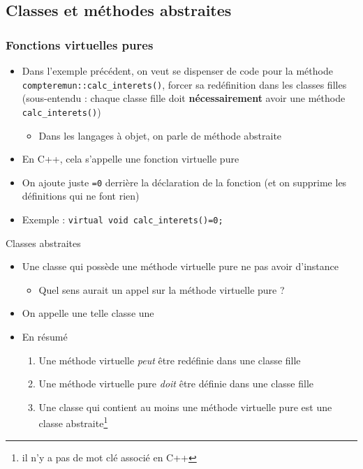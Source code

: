 


\subsection{Classes et méthodes abstraites}

\begin{frame}[fragile]\frametitle{Fonctions virtuelles pures}
\label{secabstract}
\begin{itemize}
\item Dans l'exemple précédent, on veut se dispenser de code pour la méthode \verb!compteremun::calc_interets()!, forcer sa redéfinition dans les classes filles (sous-entendu : chaque classe fille doit \textbf{nécessairement} avoir une méthode \verb|calc_interets()|)
\begin{itemize}
\item Dans les langages à objet, on parle de méthode abstraite
\end{itemize}
\item En C++, cela s'appelle une fonction virtuelle pure
\item On ajoute juste \verb|=0| derrière la déclaration de la fonction (et on supprime les définitions qui ne font rien)
\item Exemple : \verb|virtual void calc_interets()=0;|
\end{itemize}
\end{frame}

\begin{frame}{Classes abstraites}
\begin{itemize}
\item Une classe qui possède une méthode virtuelle pure ne pas avoir d'instance
\begin{itemize}
\item Quel sens aurait un appel sur la méthode virtuelle pure ?
\end{itemize}
\item On appelle une telle classe une 
\item En résumé
\begin{enumerate}
\item Une méthode virtuelle \textit{peut} être redéfinie dans une classe fille
\item Une méthode virtuelle pure \textit{doit} être définie dans une classe fille
\item Une classe qui contient au moins une méthode virtuelle pure est une classe abstraite\footnote{il n'y a pas de mot clé associé en C++}
\end{enumerate}
\end{itemize}
\end{frame}

